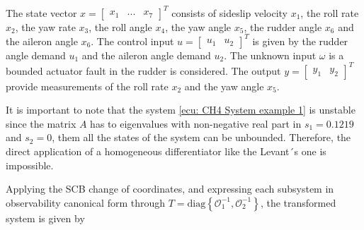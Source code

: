 \documentclass[11pt,letterpaper,twoside,openright]{report}
\begin{document}
The state vector $x = \begin{bmatrix} x_1 & ... & x_7 \end{bmatrix}^T$ consists of sideslip velocity $x_1$, the roll rate $x_2$, the yaw rate $x_3$, the roll angle $x_4$, the yaw angle $x_5$, the rudder angle $x_6$ and the aileron angle $x_6$. The control input $u = \begin{bmatrix} u_1 & u_2 \end{bmatrix}^T$ is given by the rudder angle demand $u_1$ and the aileron angle demand $u_2$. The unknown input $\omega$ is a bounded actuator fault in the rudder is considered. The output $y=\begin{bmatrix} y_1 & y_2 \end{bmatrix}^T$ provide measurements of the roll rate $x_2$ and the yaw angle $x_5$. 

It is important to note that the system \eqref{ecu: CH4 System example 1} is unstable since the matrix $A$ has to eigenvalues with non-negative real part in $s_1=0.1219$ and $s_2=0$, them all the states of the system can be unbounded. Therefore, the direct application of a homogeneous differentiator like the Levant´s one is impossible.

Applying the SCB change of coordinates, and expressing each subsystem in observability canonical form through $T=\text{diag}\left\lbrace \mathcal{O}_1^{-1},\mathcal{O}_2^{-1} \right\rbrace $, the transformed system is given by
\end{document}
